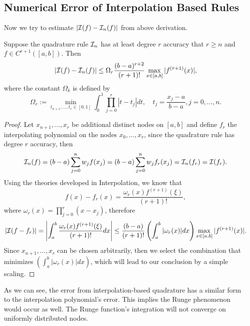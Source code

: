 \subsection{Numerical Error of Interpolation Based Rules}
Now we try to estimate $|\mathcal I(f) - \mathcal I_n(f)|$ from above derivation. 
\begin{theorem}\label{THM: ERROR QUAD RULE}Suppose the quadrature rule $\mathcal I_n$ has at least degree $r$ accuracy that $r\ge n$ and $f\in C^{r+1}([a, b])$. 
    Then 
    \begin{equation}
        |\mathcal I(f) - \mathcal I_n(f)| \le \Omega_r \frac{(b-a)^{r+2}}{(r+1)!} \max_{x\in[a, b]} |f^{(r+1)}(x)|,
    \end{equation}
    where the constant $\Omega_k$ is defined by 
    \begin{equation}
        \Omega_r := \min_{t_{n+1}, \dots, t_r\in [0, 1]} \int_0^1 \prod_{j=0}^r |t - t_j| dt, \quad t_j = \frac{x_j - a}{b-a}, j=0,\dots, n.
    \end{equation}
\end{theorem}
\begin{proof}
    Let $x_{n+1}, \dots, x_{r}$ be additional distinct nodes on $[a, b]$ and define $f_r$ the interpolating polynomial on the nodes $x_0,\dots, x_r$, since the quadrature rule has degree $r$ accuracy, then 
    $$\mathcal I_n(f) = (b-a)\sum_{j=0}^n w_j f(x_j) = (b-a)\sum_{j=0}^n w_j f_r(x_j) = \mathcal I_n(f_r) = \mathcal I(f_r).$$
    Using the theories developed in Interpolation, we know that 
\begin{equation}
    f(x) - f_r(x) = \frac{\omega_r(x) f^{(r+1)}(\xi)}{(r+1)!},
\end{equation}
where $\omega_r(x) = \prod_{j=0}^r (x - x_j)$, therefore 
\begin{equation}
   | \mathcal I(f - f_r)| = \left| \int_a^b \frac{\omega_r(x) f^{(r+1)}(\xi)}{(r+1)!} dx \right|\le \frac{(b-a)}{(r+1)!} \left(\int_a^b |\omega_r(x)|dx \right)  \max_{x\in[a,b]}|f^{(r+1)}(x)|.
\end{equation}
Since $x_{n+1},\dots, x_r$ can be chosen arbitrarily, then we select the combination that minimizes $  \left(\int_a^b |\omega_r(x)|dx \right)$, which will lead to our conclusion by a simple scaling.
\end{proof}
\begin{remark}
    As we can see, the error from interpolation-based quadrature has a similar form to the interpolation polynomial's error. This implies the Runge phenomenon would occur as well. The Runge function's integration will not converge on uniformly distributed nodes.
\end{remark}
